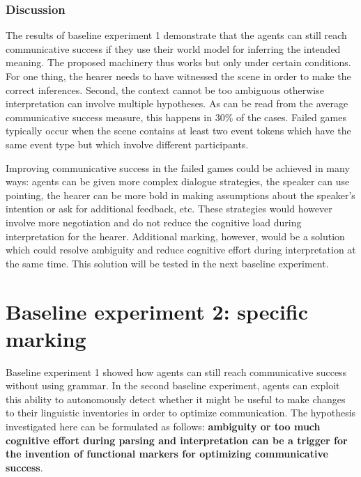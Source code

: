 \subsubsection{Discussion}
 The results of baseline experiment 1 demonstrate that the agents can still reach communicative success if they use their world model for inferring the intended meaning. The proposed machinery thus works but only under certain conditions. For one thing, the hearer needs to have witnessed the scene in order to make the correct inferences. Second, the context cannot be too ambiguous otherwise interpretation can involve multiple hypotheses. As can be read from the average communicative success measure, this happens in 30\% of the cases. Failed games typically occur when the scene contains at least two event tokens which have the same event type but which involve different participants.

\largerpage
Improving communicative success in the failed games could be achieved in many ways: agents can be given more complex dialogue strategies, the speaker can use pointing, the hearer can be more bold in making assumptions about the speaker's intention or ask for additional feedback, etc. These strategies would however involve more negotiation and do not reduce the cognitive load during interpretation for the hearer. Additional marking, however, would be a solution which could resolve ambiguity and reduce cognitive effort during interpretation at the same time. This solution will be tested in the next baseline experiment.

\section{Baseline experiment 2: specific marking}
\label{s:base2}

Baseline experiment 1 showed how agents can still reach communicative success without using grammar. In the second baseline experiment, agents can exploit this ability to autonomously detect whether it might be useful to make changes to their linguistic inventories in order to optimize communication. The hypothesis investigated here can be formulated as follows: {\bfseries ambiguity or too much cognitive effort during parsing and interpretation can be a trigger for the invention of functional markers for optimizing communicative success}.

